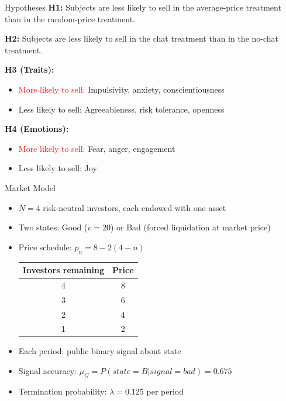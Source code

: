 \documentclass{beamer}
\begin{document}

\begin{frame}{Hypotheses}
\textbf{H1:} Subjects are less likely to sell in the average-price treatment than in the random-price treatment.
\vspace{0.3cm}

\textbf{H2:} Subjects are less likely to sell in the chat treatment than in the no-chat treatment.
\vspace{0.3cm}

\textbf{H3 (Traits):}
\begin{itemize}
    \item \textcolor{red}{More likely to sell:} Impulsivity, anxiety, conscientiousness
    \item \textcolor{green!50!black}{Less likely to sell:} Agreeableness, risk tolerance, openness
\end{itemize}
\vspace{0.3cm}

\textbf{H4 (Emotions):}
\begin{itemize}
    \item \textcolor{red}{More likely to sell:} Fear, anger, engagement
    \item \textcolor{green!50!black}{Less likely to sell:} Joy
\end{itemize}
\end{frame}


\begin{frame}{Market Model}
\begin{itemize}
    \item $N = 4$ risk-neutral investors, each endowed with one asset
    \item Two states: Good ($v = 20$) or Bad (forced liquidation at market price)
    \item Price schedule: $p_n = 8 - 2(4-n)$
    \begin{center}
    \begin{tabular}{cc}
    \toprule
    \textbf{Investors remaining} & \textbf{Price} \\
    \midrule
    4 & 8 \\
    3 & 6 \\
    2 & 4 \\
    1 & 2 \\
    \bottomrule
    \end{tabular}
    \end{center}
    \item Each period: public binary signal about state
    \item Signal accuracy: $\mu_G = P(state = B | signal = bad) = 0.675$
    \item Termination probability: $\lambda = 0.125$ per period
\end{itemize}
\end{frame}
\end{document}
